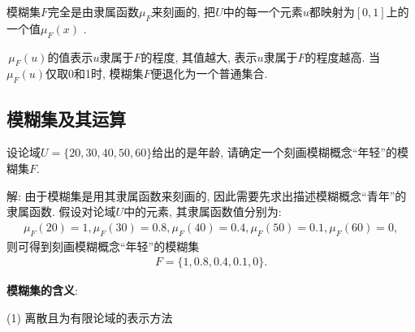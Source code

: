 \begin{remark}
 模糊集$F$完全是由隶属函数$\mu_{F}$来刻画的, 把$U$中的每一个元素$u$都映射为$[0, 1]$上的一个值$\mu_F(x)$ .

 \,$\mu_F(u)$的值表示$u$隶属于$F$的程度, 其值越大, 表示$u$隶属于$F$的程度越高. 当$\mu_F(u)$仅取0和1时, 模糊集$F$便退化为一个普通集合.
\end{remark}
\subsection{模糊集及其运算}
\begin{example}\label{AIC5Fuzzyexam551}
    设论域$U=\{20, 30, 40, 50, 60\}$给出的是年龄, 请确定一个刻画模糊概念“年轻”的模糊集$F$.
\end{example}

解: 由于模糊集是用其隶属函数来刻画的, 因此需要先求出描述模糊概念“青年”的隶属函数. 假设对论域$U$中的元素, 其隶属函数值分别为:
\begin{align}
    \mu_{F}(20)=1, \mu_{F}(30)=0.8, \mu_{F}(40)=0.4, \mu_{F}(50)=0.1, \mu_{F}(60)=0,
\end{align}
则可得到刻画模糊概念“年轻”的模糊集
\begin{align}
    F=\{ 1, 0.8, 0.4, 0.1, 0\}.
\end{align}

\textbf{模糊集的含义}:

(1) 离散且为有限论域的表示方法

